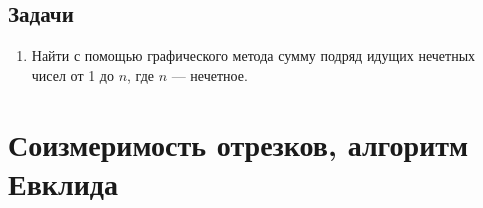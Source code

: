 \subsection*{Задачи}

\begin{enumerate}
\item Найти с помощью графического метода сумму подряд идущих нечетных чисел от 1 до $n$, где $n$ --- нечетное.
\end{enumerate}


\section{Соизмеримость отрезков, алгоритм Евклида}



